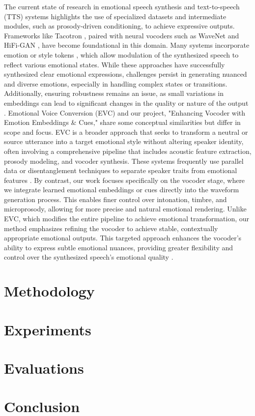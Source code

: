 \documentclass[12pt,a4paper]{article}
\begin{document}
The current state of research in emotional speech synthesis and text-to-speech
(TTS) systems highlights the use of specialized datasets and intermediate
modules, such as prosody-driven conditioning, to achieve expressive outputs.
Frameworks like Tacotron \cite{wang2017tacotron}, paired with neural vocoders
such as WaveNet \cite{oord2016wavenet} and HiFi-GAN \cite{kong2020hifi}, have
become foundational in this domain. Many systems incorporate emotion or style
tokens \cite{wang2018style}, which allow modulation of the synthesized speech to
reflect various emotional states. While these approaches have successfully
synthesized clear emotional expressions, challenges persist in generating
nuanced and diverse emotions, especially in handling complex states or
transitions. Additionally, ensuring robustness remains an issue, as small
variations in embeddings can lead to significant changes in the quality or
nature of the output \cite{zhang2021deep}. Emotional Voice Conversion (EVC) and
our project, "Enhancing Vocoder with Emotion Embeddings \& Cues," share some
conceptual similarities but differ in scope and focus. EVC is a broader approach
that seeks to transform a neutral or source utterance into a target emotional
style without altering speaker identity, often involving a comprehensive
pipeline that includes acoustic feature extraction, prosody modeling, and
vocoder synthesis. These systems frequently use parallel data or disentanglement
techniques to separate speaker traits from emotional features
\cite{zhou2020transforming}. By contrast, our work focuses specifically on the
vocoder stage, where we integrate learned emotional embeddings or cues directly
into the waveform generation process. This enables finer control over
intonation, timbre, and microprosody, allowing for more precise and natural
emotional rendering. Unlike EVC, which modifies the entire pipeline to achieve
emotional transformation, our method emphasizes refining the vocoder to achieve
stable, contextually appropriate emotional outputs. This targeted approach
enhances the vocoder’s ability to express subtle emotional nuances, providing
greater flexibility and control over the synthesized speech’s emotional quality
\cite{kim2021conditional}.

\newpage
\section {Methodology}


\newpage
\section {Experiments}

\newpage

\section{Evaluations}

\newpage
\section{Conclusion}

\newpage
\nocite{*}



\end{document}
